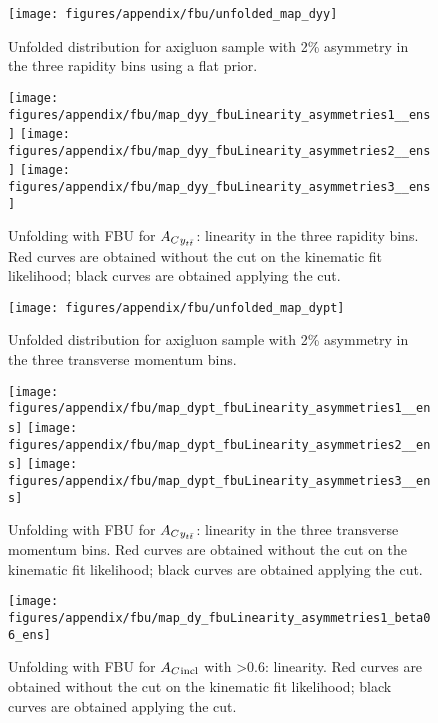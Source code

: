 %
\begin{figure}
  \begin{center}
  \texttt{[image: figures/appendix/fbu/unfolded\_map\_dyy]}
  \caption{
    \label{fig:app:fbuUnfACmtt}
    Unfolded \dy{} distribution for axigluon sample with 2\% asymmetry in the three \ttbar{} rapidity bins
    using a flat prior.
    }
  \end{center}
\end{figure}
%
\begin{figure}
  \begin{center}
  \texttt{[image: figures/appendix/fbu/map\_dyy\_fbuLinearity\_asymmetries1\_\_ens]}
  \texttt{[image: figures/appendix/fbu/map\_dyy\_fbuLinearity\_asymmetries2\_\_ens]}
  \texttt{[image: figures/appendix/fbu/map\_dyy\_fbuLinearity\_asymmetries3\_\_ens]}
  \caption{
    \label{fig:app:fbuLinACytt}
    Unfolding with FBU for $A_C{}_{y_{t\bar{t}}{}}$: linearity in the three \ttbar{} rapidity bins. Red curves are obtained
    without the cut on the kinematic fit likelihood; black curves are
    obtained applying the cut.
    }
  \end{center}
\end{figure}
%
\begin{figure}
  \begin{center}
  \texttt{[image: figures/appendix/fbu/unfolded\_map\_dypt]}
  \caption{
    \label{fig:app:fbuUnfACmtt}
    Unfolded \dy{} distribution for axigluon sample with 2\% asymmetry
    in the three \ttbar{} transverse momentum bins.
    }
  \end{center}
\end{figure}
%
\begin{figure}
  \begin{center}
  \texttt{[image: figures/appendix/fbu/map\_dypt\_fbuLinearity\_asymmetries1\_\_ens]}
  \texttt{[image: figures/appendix/fbu/map\_dypt\_fbuLinearity\_asymmetries2\_\_ens]}
  \texttt{[image: figures/appendix/fbu/map\_dypt\_fbuLinearity\_asymmetries3\_\_ens]}
  \caption{
    \label{fig:app:fbuLinACpTtt}
    Unfolding with FBU for $A_C{}_{y_{t\bar{t}}{}}$: linearity in the
    three \ttbar{} transverse momentum bins. Red curves are obtained
    without the cut on the kinematic fit likelihood; black curves are
    obtained applying the cut.
    }
  \end{center}
\end{figure}
%
\begin{figure}
  \begin{center}
  \texttt{[image: figures/appendix/fbu/map\_dy\_fbuLinearity\_asymmetries1\_beta06\_ens]}
  \caption{
    \label{fig:app:fbuLinbeta06}
    Unfolding with FBU for $A_C{}_{\text{incl}}$ with \betatt\textgreater0.6: linearity. Red curves are obtained
    without the cut on the kinematic fit likelihood; black curves are
    obtained applying the cut.
    }
  \end{center}
\end{figure}
